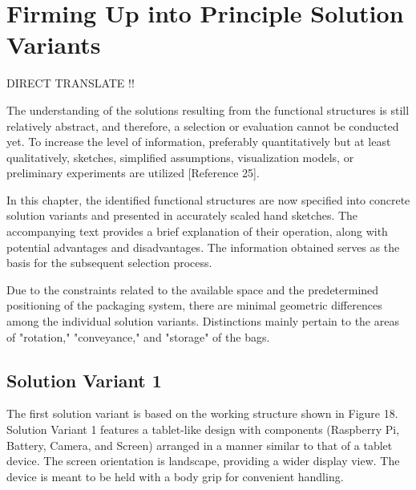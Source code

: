 \section{Firming Up into Principle Solution Variants}
DIRECT TRANSLATE !!


The understanding of the solutions resulting from the functional structures is still relatively abstract, and therefore, a selection or evaluation cannot be conducted yet. To increase the level of information, preferably quantitatively but at least qualitatively, sketches, simplified assumptions, visualization models, or preliminary experiments are utilized [Reference 25].

In this chapter, the identified functional structures are now specified into concrete solution variants and presented in accurately scaled hand sketches. The accompanying text provides a brief explanation of their operation, along with potential advantages and disadvantages. The information obtained serves as the basis for the subsequent selection process.

Due to the constraints related to the available space and the predetermined positioning of the packaging system, there are minimal geometric differences among the individual solution variants. Distinctions mainly pertain to the areas of "rotation," "conveyance," and "storage" of the bags.


\subsection{Solution Variant 1}
The first solution variant is based on the working structure shown in Figure 18.
Solution Variant 1 features a tablet-like design with components (Raspberry Pi, Battery, Camera, and Screen) arranged in a manner similar to that of a tablet device. The screen orientation is landscape, providing a wider display view. The device is meant to be held with a body grip for convenient handling.

